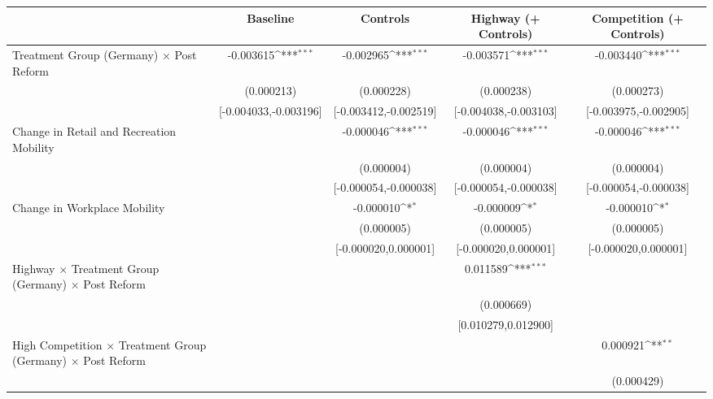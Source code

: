 {
\def\sym#1{\ifmmode^{#1}\else\(^{#1}\)\fi}
\begin{tabular}{l*{4}{c}}
\toprule
                    &\multicolumn{1}{c}{Baseline}&\multicolumn{1}{c}{Controls}&\multicolumn{1}{c}{Highway (+ Controls)}&\multicolumn{1}{c}{Competition (+ Controls)}\\
\midrule
Treatment Group (Germany) $\times$ Post Reform&   -0.003615\sym{***}&   -0.002965\sym{***}&   -0.003571\sym{***}&   -0.003440\sym{***}\\
                    &  (0.000213)         &  (0.000228)         &  (0.000238)         &  (0.000273)         \\
                    &[-0.004033,-0.003196]         &[-0.003412,-0.002519]         &[-0.004038,-0.003103]         &[-0.003975,-0.002905]         \\
Change in Retail and Recreation Mobility&                     &   -0.000046\sym{***}&   -0.000046\sym{***}&   -0.000046\sym{***}\\
                    &                     &  (0.000004)         &  (0.000004)         &  (0.000004)         \\
                    &                     &[-0.000054,-0.000038]         &[-0.000054,-0.000038]         &[-0.000054,-0.000038]         \\
Change in Workplace Mobility&                     &   -0.000010\sym{*}  &   -0.000009\sym{*}  &   -0.000010\sym{*}  \\
                    &                     &  (0.000005)         &  (0.000005)         &  (0.000005)         \\
                    &                     &[-0.000020,0.000001]         &[-0.000020,0.000001]         &[-0.000020,0.000001]         \\
Highway $\times$ Treatment Group (Germany) $\times$ Post Reform&                     &                     &    0.011589\sym{***}&                     \\
                    &                     &                     &  (0.000669)         &                     \\
                    &                     &                     &[0.010279,0.012900]         &                     \\
High Competition $\times$ Treatment Group (Germany) $\times$ Post Reform&                     &                     &                     &    0.000921\sym{**} \\
                    &                     &                     &                     &  (0.000429)         \\

\end{tabular}}
